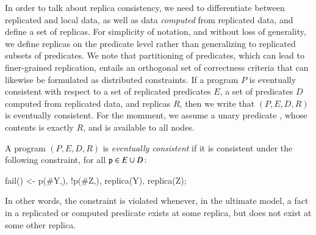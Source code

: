In order to talk about replica consistency, we need to differentiate between replicated
and local
data, as well as data {\em computed} from replicated data, and define a set of replicas.  
For simplicity of notation, and without loss of generality, we define replicas on the predicate level rather than generalizing to replicated subsets of predicates.  
We note that partitioning of predicates, which can lead to finer-grained replication, 
entails an orthogonal set of correctness criteria that can likewise be formulated as
distributed constraints.
If a \lang program $P$ is eventually consistent with respect to a set of replicated predicates $E$, a set of predicates $D$ computed from replicated data, and replicas $R$, then we write that $(P, E, D, R)$ is eventually consistent.  For the momment, we assume a unary predicate , whose contents is exactly $R$, and is available to all nodes.


\begin{definition}
\label{def:ec}
A \lang program $(P, E, D, R)$ is {\em eventually consistent} if it is consistent under the following constraint, for all $\dedalus{p} \in E \cup D$:

\begin{Dedalus}
fail() <- p(#Y,), !p(#Z,), replica(Y), replica(Z);
\end{Dedalus}

In other words, the constraint is violated whenever, in the ultimate model, a fact in a replicated or computed predicate exists at some replica, but does not exist at some other replica.
\end{definition}


